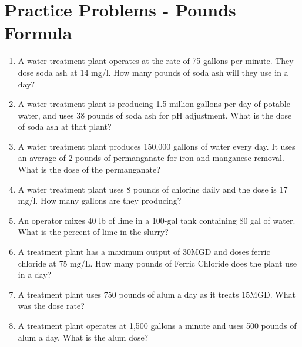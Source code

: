 \section*{Practice Problems - Pounds Formula}
\begin{enumerate}

\item A water treatment plant operates at the rate of 75 gallons per minute. They dose soda ash at
14 mg/l. How many pounds of soda ash will they use in a day?

\item A water treatment plant is producing 1.5 million gallons per day of potable water, and
uses 38 pounds of soda ash for pH adjustment. What is the dose of soda ash at that plant?

\item A water treatment plant produces 150,000 gallons of water every day. It uses an
average of 2 pounds of permanganate for iron and manganese removal. What is the dose of the
permanganate? 

\item A water treatment plant uses 8 pounds of chlorine daily and the dose is 17 mg/l. How
many gallons are they producing?

\item An operator mixes 40 lb of lime in a 100-gal tank containing 80 gal of water. What is the percent of lime in the slurry?

\item A treatment plant has a maximum output of $30 \mathrm{MGD}$ and doses ferric chloride at 75 $\mathrm{mg} / \mathrm{L}$. How many pounds of Ferric Chloride does the plant use in a day?\\

\item  A treatment plant uses 750 pounds of alum a day as it treats $15 \mathrm{MGD}$. What was the dose rate?\\


\item  A treatment plant operates at 1,500 gallons a minute and uses 500 pounds of alum a day. What is the alum dose?\\

\end{enumerate}

